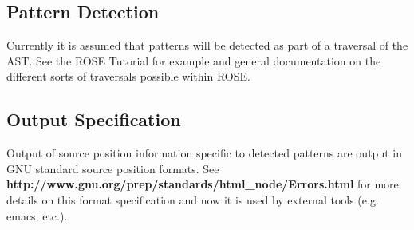 \subsection{Pattern Detection}
    Currently it is assumed that patterns will be detected as
part of a traversal of the AST.  See the ROSE Tutorial for example and 
general documentation on the different sorts of traversals possible 
within ROSE.

\subsection{Output Specification}

   Output of source position information specific to detected 
patterns are output in GNU standard source position formats.
See {\bf http://www.gnu.org/prep/standards/html\_node/Errors.html}
for more details on this format specification and now it is used
by external tools (e.g. emacs, etc.).








